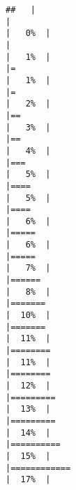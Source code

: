 \documentclass[
]{article}
\begin{document}
\begin{verbatim}
##   |                                                                              |                                                                      |   0%  |                                                                              |                                                                      |   1%  |                                                                              |=                                                                     |   1%  |                                                                              |=                                                                     |   2%  |                                                                              |==                                                                    |   3%  |                                                                              |==                                                                    |   4%  |                                                                              |===                                                                   |   5%  |                                                                              |====                                                                  |   5%  |                                                                              |====                                                                  |   6%  |                                                                              |=====                                                                 |   6%  |                                                                              |=====                                                                 |   7%  |                                                                              |======                                                                |   8%  |                                                                              |=======                                                               |  10%  |                                                                              |=======                                                               |  11%  |                                                                              |========                                                              |  11%  |                                                                              |========                                                              |  12%  |                                                                              |=========                                                             |  13%  |                                                                              |=========                                                             |  14%  |                                                                              |==========                                                            |  15%  |                                                                              |============                                                          |  17%  |                                                                              
\end{verbatim}
\end{document}
